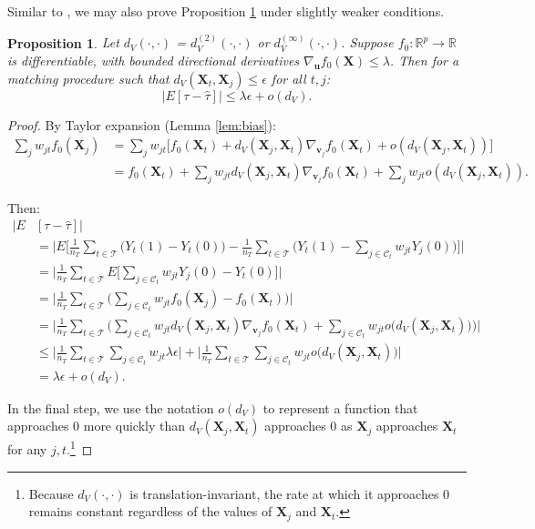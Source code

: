 \documentclass{article}
\newtheorem{proposition}[theorem]{Proposition}
\newcommand{\Xt}{\mathbf{X}_t}
\newcommand{\Xj}{\mathbf{X}_j}
\newcommand{\vj}{\mathbf{v}_j}
\newcommand{\Ct}{\mathcal{C}_{t}}
\begin{document}
Similar to \citet{iacus2011multivariate}, we may also prove Proposition \ref{prop:biasbd} under slightly weaker conditions.
\begin{proposition}
\label{prop:biasbd}
Let $d_V(\cdot, \cdot)$ = $d^{(2)}_V(\cdot, \cdot)$ or $d^{(\infty)}_V(\cdot, \cdot)$.
Suppose $f_0: \mathbb{R}^p \to \mathbb{R}$ is differentiable, with bounded directional derivatives $\nabla_{\mathbf{u}} f_0(\mathbf{X}) \leq \lambda$.
Then for a matching procedure such that $d_V(\Xt, \Xj) \leq \epsilon$ for all $t,j$:
\begin{equation*}
    \big|E[\tau - \hat{\tau}] \big| \leq \lambda \epsilon + o(d_V).
\end{equation*}
\end{proposition}
\begin{proof}
    By Taylor expansion (Lemma \ref{lem:bias}):
    \begin{align*}
        \sum_j w_{jt} f_0(\Xj)
        &= \sum_j w_{jt} \Big[ f_0(\Xt) + d_V(\Xj, \Xt) \nabla_{\vj} f_0(\Xt) + o(d_V(\Xj, \Xt)) \Big] \\
        &= f_0(\Xt) + \sum_j w_{jt} d_V(\Xj, \Xt) \nabla_{\vj} f_0(\Xt) + \sum_j w_{jt} o(d_V(\Xj, \Xt)).
    \end{align*}

    Then:
    \begin{align*}
        \big| E &[\tau - \hat{\tau} ] \big| \\
        &= \bigg| E\Big[\frac{1}{n_T}\sum_{t \in \mathcal{T}} \big( Y_t(1) - Y_t(0) \big) - \frac{1}{n_T}\sum_{t \in \mathcal{T}} \big( Y_t(1) - \sum_{j \in \Ct} w_{jt} Y_j(0) \big) \Big] \bigg| \\
        &= \bigg| \frac{1}{n_T} \sum_{t \in \mathcal{T}} 
            E\Big[ \sum_{j \in \Ct} w_{jt} Y_j(0) - Y_t(0) \Big]\bigg| \\
        &= \bigg| \frac{1}{n_T} \sum_{t \in \mathcal{T}} 
            \Big( \sum_{j \in \Ct} w_{jt} f_0(\Xj) - f_0(\Xt) \Big) \bigg| \\
        &= \bigg| \frac{1}{n_T} \sum_{t \in \mathcal{T}} 
            \Big( \sum_{j \in \Ct} w_{jt} d_V(\Xj, \Xt) \nabla_{\vj} f_0(\Xt) 
            + \sum_{j \in \Ct} w_{jt} o\big(d_V(\Xj, \Xt)\big) \Big) \bigg| \\
        &\leq \bigg| \frac{1}{n_T} \sum_{t \in \mathcal{T}} 
            \sum_{j \in \Ct} w_{jt} \lambda \epsilon \bigg|
            + \bigg| \frac{1}{n_T} \sum_{t \in \mathcal{T}} \sum_{j \in \Ct} w_{jt} o\big(d_V(\Xj, \Xt)\big) \bigg| \\
        &= \lambda \epsilon + o(d_V).
    \end{align*}

    In the final step, we use the notation $o(d_V)$ to represent a function that approaches 0 more quickly than $d_V(\Xj, \Xt)$ approaches 0 as $\Xj$ approaches $\Xt$ for any $j, t$.\footnote{Because $d_V(\cdot, \cdot)$ is translation-invariant, the rate at which it approaches 0 remains constant regardless of the values of $\Xj$ and $\Xt$.}
\end{proof}
\end{document}
